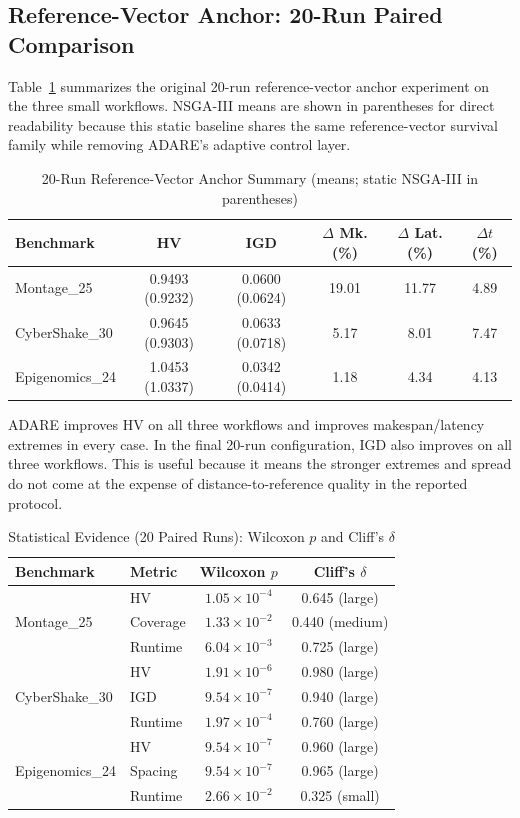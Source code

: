 \documentclass[runningheads]{llncs}
\begin{document}
\subsection{Reference-Vector Anchor: 20-Run Paired Comparison}
Table~\ref{tab:main20} summarizes the original 20-run reference-vector anchor experiment on the three small workflows. NSGA-III means are shown in parentheses for direct readability because this static baseline shares the same reference-vector survival family while removing ADARE's adaptive control layer.

\begin{table}[t]
\caption{20-Run Reference-Vector Anchor Summary (means; static NSGA-III in parentheses)}
\label{tab:main20}
\centering
\small
\begin{tabular}{@{}lccccc@{}}
\toprule
Benchmark & HV & IGD & $\Delta$ Mk. (\%) & $\Delta$ Lat. (\%) & $\Delta t$ (\%) \\
\midrule
Montage\_25 & 0.9493 (0.9232) & 0.0600 (0.0624) & 19.01 & 11.77 & 4.89 \\
CyberShake\_30 & 0.9645 (0.9303) & 0.0633 (0.0718) & 5.17 & 8.01 & 7.47 \\
Epigenomics\_24 & 1.0453 (1.0337) & 0.0342 (0.0414) & 1.18 & 4.34 & 4.13 \\
\bottomrule
\end{tabular}
\end{table}

ADARE improves HV on all three workflows and improves makespan/latency extremes in every case. In the final 20-run configuration, IGD also improves on all three workflows. This is useful because it means the stronger extremes and spread do not come at the expense of distance-to-reference quality in the reported protocol.

\begin{table}[t]
\caption{Statistical Evidence (20 Paired Runs): Wilcoxon $p$ and Cliff's $\delta$}
\label{tab:stats20}
\centering
\scriptsize
\begin{tabular}{@{}l l c c@{}}
\toprule
Benchmark & Metric & Wilcoxon $p$ & Cliff's $\delta$ \\
\midrule
\multirow{3}{*}{Montage\_25}
& HV & $1.05\times10^{-4}$ & 0.645 (large) \\
& Coverage & $1.33\times10^{-2}$ & 0.440 (medium) \\
& Runtime & $6.04\times10^{-3}$ & 0.725 (large) \\
\midrule
\multirow{3}{*}{CyberShake\_30}
& HV & $1.91\times10^{-6}$ & 0.980 (large) \\
& IGD & $9.54\times10^{-7}$ & 0.940 (large) \\
& Runtime & $1.97\times10^{-4}$ & 0.760 (large) \\
\midrule
\multirow{3}{*}{Epigenomics\_24}
& HV & $9.54\times10^{-7}$ & 0.960 (large) \\
& Spacing & $9.54\times10^{-7}$ & 0.965 (large) \\
& Runtime & $2.66\times10^{-2}$ & 0.325 (small) \\
\bottomrule
\end{tabular}
\end{table}
\end{document}
